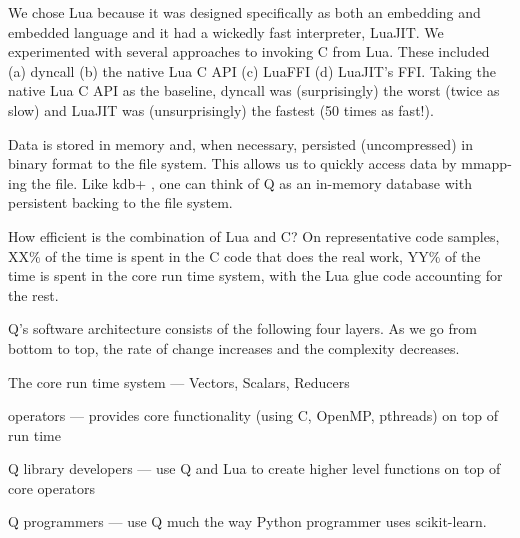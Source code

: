 We chose Lua
because it was designed specifically as both an embedding and embedded language
\cite{Lua2011} and it had a wickedly fast interpreter, LuaJIT.
We experimented with several approaches to invoking C from Lua. These included
(a) dyncall \cite{Adler2013} (b) the native Lua C API (c) LuaFFI (d) LuaJIT's
FFI. Taking the native Lua C API as the baseline, dyncall was (surprisingly) the worst (twice
as slow) and LuaJIT was (unsurprisingly) the fastest (50 times as fast!).

Data is stored in memory and, when necessary, persisted (uncompressed) in
binary format to the file system. This allows us to quickly access data by
mmapp-ing the file.  Like kdb+ \cite{Borror2015}, one can think of Q as 
an in-memory database with persistent backing to the file system.

How efficient is the combination of Lua and C? On representative code samples,
XX\% of the time is spent in the C code that does the real work, YY\% of the
time is spent in the core run time system, with the Lua glue code accounting for
the rest. 

Q's software architecture consists of the following four layers. As we go from
bottom to top, the rate of change increases and the complexity decreases.
\be
\item The core run time system --- Vectors, Scalars, Reducers
\item operators --- provides core functionality (using C, OpenMP, pthreads) on
  top of run time
\item Q library developers --- use Q and Lua to create higher level functions on
  top of core operators
\item Q programmers --- use Q much the way  Python programmer uses scikit-learn.
  \ee







% 
